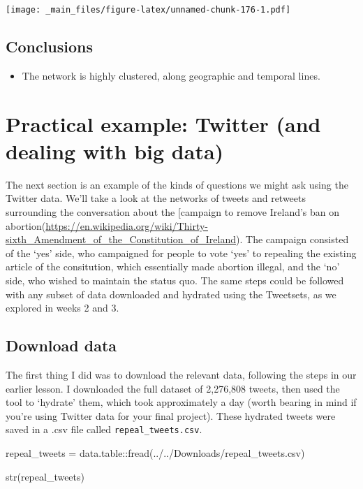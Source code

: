 \documentclass[
]{book}
\newenvironment{Shaded}{\begin{snugshade}}{\end{snugshade}}
\newcommand{\FunctionTok}[1]{\textcolor[rgb]{0.00,0.00,0.00}{#1}}
\newcommand{\NormalTok}[1]{#1}
\newcommand{\OtherTok}[1]{\textcolor[rgb]{0.56,0.35,0.01}{#1}}
\newcommand{\SpecialCharTok}[1]{\textcolor[rgb]{0.00,0.00,0.00}{#1}}
\newcommand{\StringTok}[1]{\textcolor[rgb]{0.31,0.60,0.02}{#1}}
\providecommand{\tightlist}{%
  \setlength{\itemsep}{0pt}\setlength{\parskip}{0pt}}
\begin{document}
\texttt{[image: \_main\_files/figure-latex/unnamed-chunk-176-1.pdf]}

\hypertarget{conclusions-3}{%
\subsection{Conclusions}\label{conclusions-3}}

\begin{itemize}
\tightlist
\item
  The network is highly clustered, along geographic and temporal lines.
\end{itemize}

\hypertarget{practical-example-twitter-and-dealing-with-big-data}{%
\section{Practical example: Twitter (and dealing with big data)}\label{practical-example-twitter-and-dealing-with-big-data}}

The next section is an example of the kinds of questions we might ask using the Twitter data. We'll take a look at the networks of tweets and retweets surrounding the conversation about the {[}campaign to remove Ireland's ban on abortion(\url{https://en.wikipedia.org/wiki/Thirty-sixth_Amendment_of_the_Constitution_of_Ireland}). The campaign consisted of the `yes' side, who campaigned for people to vote `yes' to repealing the existing article of the consitution, which essentially made abortion illegal, and the `no' side, who wished to maintain the status quo. The same steps could be followed with any subset of data downloaded and hydrated using the Tweetsets, as we explored in weeks 2 and 3.

\hypertarget{download-data}{%
\subsection{Download data}\label{download-data}}

The first thing I did was to download the relevant data, following the steps in our earlier lesson. I downloaded the full dataset of 2,276,808 tweets, then used the tool to `hydrate' them, which took approximately a day (worth bearing in mind if you're using Twitter data for your final project). These hydrated tweets were saved in a .csv file called \texttt{repeal\_tweets.csv}.

\begin{Shaded}
\begin{Highlighting}[]
\NormalTok{repeal\_tweets }\OtherTok{=}\NormalTok{ data.table}\SpecialCharTok{::}\FunctionTok{fread}\NormalTok{(}\StringTok{\textquotesingle{}../../Downloads/repeal\_tweets.csv\textquotesingle{}}\NormalTok{)}

\FunctionTok{str}\NormalTok{(repeal\_tweets)}
\end{Highlighting}
\end{Shaded}
\end{document}
